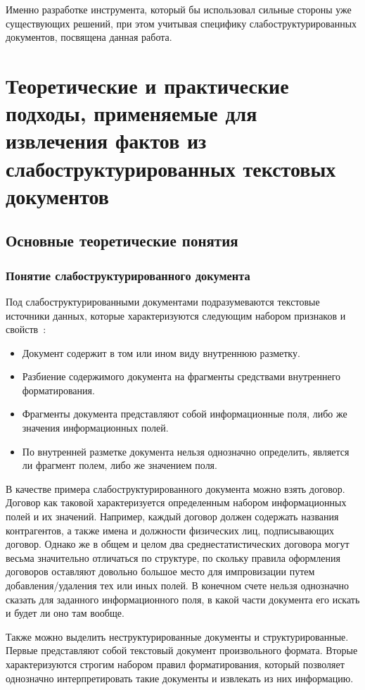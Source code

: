 Именно разработке инструмента, который бы использовал сильные стороны уже существующих решений, при этом учитывая специфику слабоструктурированных документов, посвящена данная работа.
\chapter{Теоретические и практические подходы, применяемые для извлечения фактов из слабоструктурированных текстовых документов}
\section{Основные теоретические понятия}
\subsection{Понятие слабоструктурированного документа}
Под слабоструктурированными документами подразумеваются текстовые источники данных, которые характеризуются следующим набором признаков и свойств~\autocite{WeakStructuredDocs}:
\begin{itemize}
  \item Документ содержит в том или ином виду внутреннюю разметку.
  \item Разбиение содержимого документа на фрагменты средствами внутреннего форматирования.
  \item Фрагменты документа представляют собой информационные поля, либо же значения информационных полей.
  \item По внутренней разметке документа нельзя однозначно определить, является ли фрагмент полем, либо же значением поля.
\end{itemize}
В качестве примера слабоструктурированного документа можно взять договор. Договор как таковой характеризуется определенным набором информационных полей и их значений. Например, каждый договор должен содержать названия контрагентов, а также имена и должности физических лиц, подписывающих договор. Однако же в общем и целом два среднестатистических договора могут весьма значительно отличаться по структуре, по скольку правила оформления договоров оставляют довольно большое место для импровизации путем добавления/удаления тех или иных полей. В конечном счете нельзя однозначно сказать для заданного информационного поля, в какой части документа его искать и будет ли оно там вообще.

Также можно выделить неструктурированные документы и структурированные. Первые представляют собой текстовый документ произвольного формата. Вторые характеризуются строгим набором правил форматирования, который позволяет однозначно интерпретировать такие документы и извлекать из них информацию.

